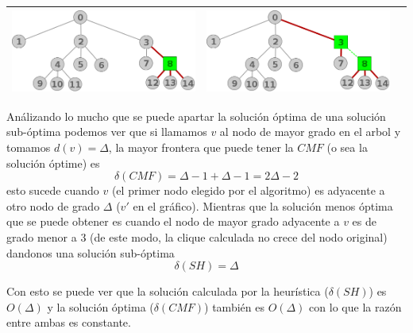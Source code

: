 \begin{center}
\begin{tabular}{ |c||c||c| }
			\includegraphics[scale = 0.3]{img/ej3/constructiva_golosa/tree_st11.png} &
			\includegraphics[scale = 0.3]{img/ej3/constructiva_golosa/tree_st12.png} \\
			\hline
		\end{tabular}
	\end{center}

An\'alizando lo mucho que se puede apartar la soluci\'on \'optima de una soluci\'on sub-\'optima
podemos ver que si llamamos $v$ al nodo de mayor grado en el arbol y tomamos $d(v) = \Delta$, la
mayor frontera que puede tener la $CMF$ (o sea la soluci\'on \'optime) es
\[ \delta(CMF) = \Delta -1 + \Delta -1 = 2 \Delta -2 \]
esto sucede cuando $v$ (el primer nodo elegido por el algoritmo) es adyacente a otro nodo de grado
$\Delta$ ($v'$ en el gr\'afico). Mientras que la soluci\'on menos \'optima que se puede obtener es 
cuando el nodo de mayor grado adyacente a $v$ es de grado menor a 3 
(de este modo, la clique calculada no crece del nodo original) dandonos una soluci\'on sub-\'optima
\[ \delta(SH) = \Delta \]

Con esto se puede ver que la soluci\'on calculada por la heur\'istica ($\delta(SH)$) es $O(\Delta)$ 
y la soluci\'on \'optima ($\delta(CMF)$) tambi\'en es $O(\Delta)$ con lo que la raz\'on entre ambas 
es constante.
			
